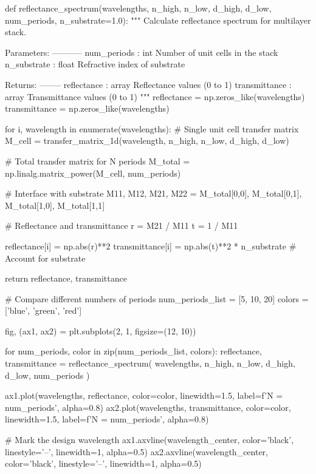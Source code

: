 \documentclass[11pt,a4paper]{article}
\begin{document}
\begin{pycode}
def reflectance_spectrum(wavelengths, n_high, n_low, d_high, d_low, num_periods, n_substrate=1.0):
    """
    Calculate reflectance spectrum for multilayer stack.

    Parameters:
    -----------
    num_periods : int
        Number of unit cells in the stack
    n_substrate : float
        Refractive index of substrate

    Returns:
    --------
    reflectance : array
        Reflectance values (0 to 1)
    transmittance : array
        Transmittance values (0 to 1)
    """
    reflectance = np.zeros_like(wavelengths)
    transmittance = np.zeros_like(wavelengths)

    for i, wavelength in enumerate(wavelengths):
        # Single unit cell transfer matrix
        M_cell = transfer_matrix_1d(wavelength, n_high, n_low, d_high, d_low)

        # Total transfer matrix for N periods
        M_total = np.linalg.matrix_power(M_cell, num_periods)

        # Interface with substrate
        M11, M12, M21, M22 = M_total[0,0], M_total[0,1], M_total[1,0], M_total[1,1]

        # Reflectance and transmittance
        r = M21 / M11
        t = 1 / M11

        reflectance[i] = np.abs(r)**2
        transmittance[i] = np.abs(t)**2 * n_substrate  # Account for substrate

    return reflectance, transmittance

# Compare different numbers of periods
num_periods_list = [5, 10, 20]
colors = ['blue', 'green', 'red']

fig, (ax1, ax2) = plt.subplots(2, 1, figsize=(12, 10))

for num_periods, color in zip(num_periods_list, colors):
    reflectance, transmittance = reflectance_spectrum(
        wavelengths, n_high, n_low, d_high, d_low, num_periods
    )

    ax1.plot(wavelengths, reflectance, color=color, linewidth=1.5,
             label=f'N = {num_periods}', alpha=0.8)
    ax2.plot(wavelengths, transmittance, color=color, linewidth=1.5,
             label=f'N = {num_periods}', alpha=0.8)

# Mark the design wavelength
ax1.axvline(wavelength_center, color='black', linestyle='--', linewidth=1, alpha=0.5)
ax2.axvline(wavelength_center, color='black', linestyle='--', linewidth=1, alpha=0.5)


\end{pycode}
\end{document}

